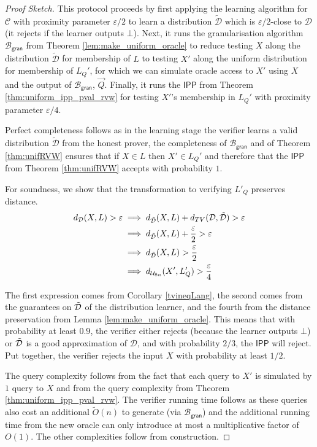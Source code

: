 \documentclass[10pt,a4paper]{article}
\newcommand{\IPP}{\mathsf{IPP}}
\newcommand{\gran}{\mathsf{gran}}
\newcommand{\sU}{\mathcal{U}}
\newcommand{\sD}{\mathcal{D}}
\newcommand{\sB}{\mathcal{B}}
\begin{document}
\begin{proof}[Proof Sketch]

This protocol proceeds by first applying the learning algorithm for $\mathcal{C}$ with proximity parameter $\varepsilon/2$  to learn a distribution $\tilde{\sD}$ which is $\varepsilon/2$-close to $\sD$ (it rejects if the learner outputs $\bot$). Next, it runs the granularisation algorithm $\sB_\gran$ from Theorem \ref{lem:make_uniform_oracle} to reduce testing $X$ along the distribution $\tilde{\sD}$ for membership of $L$ to testing $X'$ along the uniform distribution for membership of $L_Q'$, for which we can simulate oracle access to $X'$ using $X$ and the output of $\sB_\gran$, $\vec{Q}$. Finally, it runs the $\IPP$ from Theorem \ref{thm:uniform_ipp_pval_rvw} for testing $X'$'s membership in $L_Q'$ with proximity parameter $\varepsilon/4$.

Perfect completeness follows as in the learning stage the verifier learns a valid distribution $\tilde{\sD}$ from the honest prover, the completeness of $\sB_\gran$ and of Theorem \ref{thm:unifRVW} ensures that if $X\in L$ then $X'\in L_Q'$ and therefore that the $\IPP$ from Theorem \ref{thm:unifRVW} accepts with probability $1$.

For soundness, we show that the transformation to verifying $L'_Q$ preserves distance.
\[
\begin{split}
    d_{\sD}(X,L)>\varepsilon &\implies d_{\Tilde{\sD}}(X,L)+d_{TV}(\sD, \Tilde{\sD})>\varepsilon\\
    &\implies d_{\Tilde{\sD}}(X,L)+\frac{\varepsilon}{2}>\varepsilon\\
    &\implies d_{\Tilde{\sD}}(X,L)>\frac{\varepsilon}{2}\\
    &\implies d_{\sU_{8n}}(X',L_Q')>\frac{\varepsilon}{4}\\
\end{split}
\]

The first expression comes from Corollary \ref{tvineqLang}, the second comes from the guarantees on $\Tilde{\sD}$ of the distribution learner, and the fourth from the distance preservation from Lemma \ref{lem:make_uniform_oracle}. This means that with probability at least $0.9$, the verifier either rejects (because the learner outputs $\bot$) or $\Tilde{\sD}$ is a good approximation of $\sD$, and with probability $2/3$, the $\IPP$ will reject. Put together, the verifier rejects the input $X$ with probability at least $1/2$.

The query complexity follows from the fact that each query to $X'$ is simulated by $1$ query to $X$ and from the query complexity from Theorem \ref{thm:uniform_ipp_pval_rvw}. The verifier running time follows as these queries also cost an additional $\tilde{O}(n)$ to generate (via $\sB_\gran$) and the additional running time from the new oracle can only introduce at most a multiplicative factor of $O(1)$. The other complexities follow from construction.
\end{proof}
\end{document}
